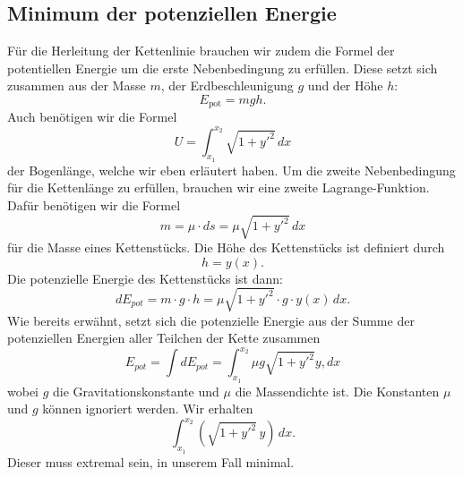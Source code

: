 \subsection{Minimum der potenziellen Energie
\label{kettenlinie:subsection:Minimum der potenziellen Energie}}
Für die Herleitung der Kettenlinie brauchen wir zudem die Formel der potentiellen Energie um die erste Nebenbedingung zu erfüllen. Diese setzt sich zusammen aus der Masse \(m\), der Erdbeschleunigung \(g\) und der Höhe \(h\):
\begin{equation}
	E_{\text{pot}}
	=
	mgh.
\end{equation}
Auch benötigen wir die Formel 
\begin{equation}
	U
	=
	\int_{x_1}^{x_2} \sqrt{1 + y'^2} \, dx
\end{equation}
der Bogenlänge, welche wir eben erläutert haben.
Um die zweite Nebenbedingung für die Kettenlänge zu erfüllen, brauchen wir eine zweite Lagrange-Funktion.
Dafür benötigen wir die Formel
\begin{equation}
	m = \mu \cdot ds = \mu \sqrt{1 + y'^2} \, dx
\end{equation}
für die Masse eines Kettenstücks.
Die Höhe des Kettenstücks ist definiert durch
\begin{equation}
	h = y(x).
\end{equation}
Die potenzielle Energie des Kettenstücks ist dann:
\begin{equation}
	dE_{pot} = m \cdot g \cdot h = \mu \sqrt{1 + y'^2} \cdot g \cdot y(x) \, dx.
\end{equation}
Wie bereits erwähnt, setzt sich die potenzielle Energie aus der Summe der potenziellen Energien aller Teilchen der Kette zusammen
\begin{equation}
	E_{pot} = \int dE_{pot} = \int_{x_1}^{x_2} \mu g \sqrt{1 + y'^2} y, dx
\end{equation}
wobei \(g\) die Gravitationskonstante und \(\mu\) die Massendichte ist.
Die Konstanten \(\mu\) und \(g\) können ignoriert werden.
Wir erhalten
\begin{equation}
	\int_{x_1}^{x_2} (\sqrt{1 + y'^2} \, y) \, dx.
\end{equation}
Dieser muss extremal sein, in unserem Fall minimal.

